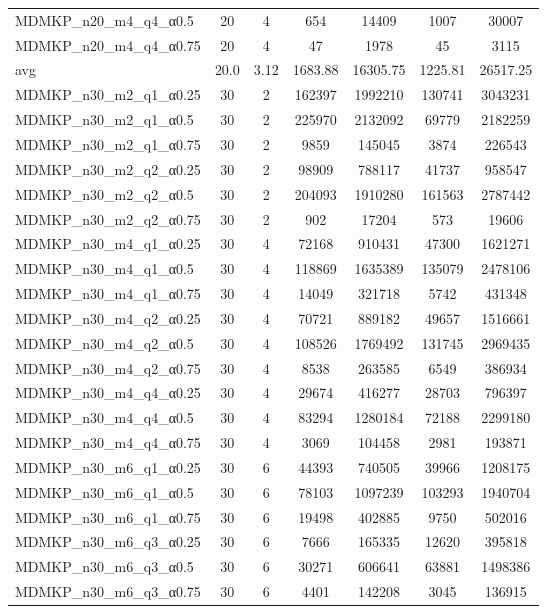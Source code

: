 \begin{table}[!ht]
\begin{tabular}{lcccccc}
MDMKP\_n20\_m4\_q4\_α0.5 & 20 & 4 & 654 & 14409 & 1007 & 30007 \\
MDMKP\_n20\_m4\_q4\_α0.75 & 20 & 4 & 47 & 1978 & 45 & 3115 \\
\cline{1-9} avg & 20.0 & 3.12 & 1683.88& 16305.75 & 1225.81& 26517.25\\ \hline
MDMKP\_n30\_m2\_q1\_α0.25 & 30 & 2 & 162397 & 1992210 & 130741 & 3043231 \\
MDMKP\_n30\_m2\_q1\_α0.5 & 30 & 2 & 225970 & 2132092 & 69779 & 2182259 \\
MDMKP\_n30\_m2\_q1\_α0.75 & 30 & 2 & 9859 & 145045 & 3874 & 226543 \\
MDMKP\_n30\_m2\_q2\_α0.25 & 30 & 2 & 98909 & 788117 & 41737 & 958547 \\
MDMKP\_n30\_m2\_q2\_α0.5 & 30 & 2 & 204093 & 1910280 & 161563 & 2787442 \\
MDMKP\_n30\_m2\_q2\_α0.75 & 30 & 2 & 902 & 17204 & 573 & 19606 \\
MDMKP\_n30\_m4\_q1\_α0.25 & 30 & 4 & 72168 & 910431 & 47300 & 1621271 \\
MDMKP\_n30\_m4\_q1\_α0.5 & 30 & 4 & 118869 & 1635389 & 135079 & 2478106 \\
MDMKP\_n30\_m4\_q1\_α0.75 & 30 & 4 & 14049 & 321718 & 5742 & 431348 \\
MDMKP\_n30\_m4\_q2\_α0.25 & 30 & 4 & 70721 & 889182 & 49657 & 1516661 \\
MDMKP\_n30\_m4\_q2\_α0.5 & 30 & 4 & 108526 & 1769492 & 131745 & 2969435 \\
MDMKP\_n30\_m4\_q2\_α0.75 & 30 & 4 & 8538 & 263585 & 6549 & 386934 \\
MDMKP\_n30\_m4\_q4\_α0.25 & 30 & 4 & 29674 & 416277 & 28703 & 796397 \\
MDMKP\_n30\_m4\_q4\_α0.5 & 30 & 4 & 83294 & 1280184 & 72188 & 2299180 \\
MDMKP\_n30\_m4\_q4\_α0.75 & 30 & 4 & 3069 & 104458 & 2981 & 193871 \\
MDMKP\_n30\_m6\_q1\_α0.25 & 30 & 6 & 44393 & 740505 & 39966 & 1208175 \\
MDMKP\_n30\_m6\_q1\_α0.5 & 30 & 6 & 78103 & 1097239 & 103293 & 1940704 \\
MDMKP\_n30\_m6\_q1\_α0.75 & 30 & 6 & 19498 & 402885 & 9750 & 502016 \\
MDMKP\_n30\_m6\_q3\_α0.25 & 30 & 6 & 7666 & 165335 & 12620 & 395818 \\
MDMKP\_n30\_m6\_q3\_α0.5 & 30 & 6 & 30271 & 606641 & 63881 & 1498386 \\
MDMKP\_n30\_m6\_q3\_α0.75 & 30 & 6 & 4401 & 142208 & 3045 & 136915 \\

\end{tabular}
\end{table}
